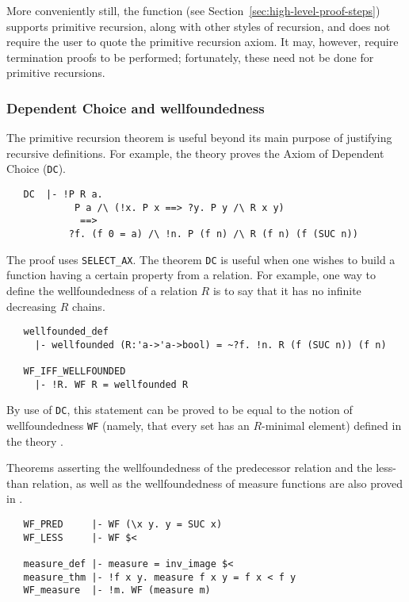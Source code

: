 More conveniently still, the  function (see
Section~\ref{sec:high-level-proof-steps}) supports primitive
recursion, along with other styles of recursion, and does not require
the user to quote the primitive recursion axiom. It may, however,
require termination proofs to be performed; fortunately, these need
not be done for primitive recursions.

\subsubsection{Dependent Choice and wellfoundedness}
\label{prim-rec-conseq}

The primitive recursion theorem is useful beyond its main purpose of
justifying recursive definitions. For example, the theory
 proves the Axiom of Dependent Choice ({\small\verb+DC+}).

\begin{hol}
{\small
\begin{verbatim}
   DC  |- !P R a.
            P a /\ (!x. P x ==> ?y. P y /\ R x y)
             ==>
           ?f. (f 0 = a) /\ !n. P (f n) /\ R (f n) (f (SUC n))
\end{verbatim}
}
\end{hol}

The proof uses {\small\verb+SELECT_AX+}. The theorem {\small\verb+DC+}
is useful when one wishes to build a function having a certain
property from a relation. For example, one way to define the
wellfoundedness of a relation $R$ is to say that it has no infinite
decreasing $R$ chains.
%
\begin{hol}
\begin{verbatim}
   wellfounded_def
     |- wellfounded (R:'a->'a->bool) = ~?f. !n. R (f (SUC n)) (f n)

   WF_IFF_WELLFOUNDED
     |- !R. WF R = wellfounded R
\end{verbatim}
\end{hol}
By use of {\small\verb+DC+}, this statement can be proved
to be equal to the notion of wellfoundedness {\small\verb+WF+}
(namely, that every set has an $R$-minimal element) defined in the theory
.

Theorems asserting the wellfoundedness of the predecessor relation and
the less-than relation, as well as the wellfoundedness of measure
functions are also proved in .

\begin{hol}
\begin{verbatim}
   WF_PRED     |- WF (\x y. y = SUC x)
   WF_LESS     |- WF $<

   measure_def |- measure = inv_image $<
   measure_thm |- !f x y. measure f x y = f x < f y
   WF_measure  |- !m. WF (measure m)
\end{verbatim}
\end{hol}


